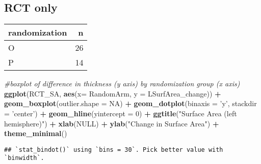 \documentclass[]{article}
\newenvironment{Shaded}{\begin{snugshade}}{\end{snugshade}}
\newcommand{\KeywordTok}[1]{\textcolor[rgb]{0.13,0.29,0.53}{\textbf{#1}}}
\newcommand{\DataTypeTok}[1]{\textcolor[rgb]{0.13,0.29,0.53}{#1}}
\newcommand{\DecValTok}[1]{\textcolor[rgb]{0.00,0.00,0.81}{#1}}
\newcommand{\StringTok}[1]{\textcolor[rgb]{0.31,0.60,0.02}{#1}}
\newcommand{\CommentTok}[1]{\textcolor[rgb]{0.56,0.35,0.01}{\textit{#1}}}
\newcommand{\OtherTok}[1]{\textcolor[rgb]{0.56,0.35,0.01}{#1}}
\newcommand{\OperatorTok}[1]{\textcolor[rgb]{0.81,0.36,0.00}{\textbf{#1}}}
\newcommand{\NormalTok}[1]{#1}
\theoremstyle{definition}
\theoremstyle{definition}
\theoremstyle{definition}
\theoremstyle{remark}
\begin{document}
\subsection{RCT only}\label{rct-only-1}

\begin{Shaded}
\end{Shaded}

\begin{tabular}{l|r}
\hline
randomization & n\\
\hline
O & 26\\
\hline
P & 14\\
\hline
\end{tabular}

\begin{Shaded}
\begin{Highlighting}[]
\CommentTok{#boxplot of difference in thickness (y axis) by randomization group (x axis)}
\KeywordTok{ggplot}\NormalTok{(RCT_SA, }\KeywordTok{aes}\NormalTok{(}\DataTypeTok{x=}\NormalTok{ RandomArm, }\DataTypeTok{y =}\NormalTok{ LSurfArea_change)) }\OperatorTok{+}\StringTok{ }
\StringTok{     }\KeywordTok{geom_boxplot}\NormalTok{(}\DataTypeTok{outlier.shape =} \OtherTok{NA}\NormalTok{) }\OperatorTok{+}\StringTok{ }
\StringTok{     }\KeywordTok{geom_dotplot}\NormalTok{(}\DataTypeTok{binaxis =} \StringTok{'y'}\NormalTok{, }\DataTypeTok{stackdir =} \StringTok{'center'}\NormalTok{) }\OperatorTok{+}
\StringTok{     }\KeywordTok{geom_hline}\NormalTok{(}\DataTypeTok{yintercept =} \DecValTok{0}\NormalTok{) }\OperatorTok{+}
\StringTok{     }\KeywordTok{ggtitle}\NormalTok{(}\StringTok{"Surface Area (left hemisphere)"}\NormalTok{) }\OperatorTok{+}
\StringTok{     }\KeywordTok{xlab}\NormalTok{(}\OtherTok{NULL}\NormalTok{) }\OperatorTok{+}
\StringTok{     }\KeywordTok{ylab}\NormalTok{(}\StringTok{"Change in Surface Area"}\NormalTok{) }\OperatorTok{+}
\StringTok{     }\KeywordTok{theme_minimal}\NormalTok{()}
\end{Highlighting}
\end{Shaded}

\begin{verbatim}
## `stat_bindot()` using `bins = 30`. Pick better value with `binwidth`.
\end{verbatim}
\end{document}
